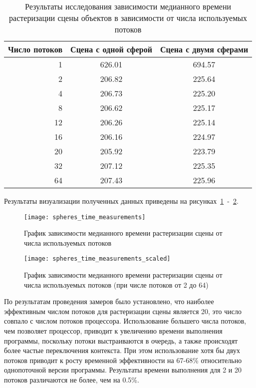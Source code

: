 \begin{table}[H]
	\begin{center}
		\begin{threeparttable}
			\centering
			\captionsetup{justification=raggedleft,singlelinecheck=off}
			\caption{\label{tb:meas}Результаты исследования зависимости медианного времени растеризации сцены объектов в зависимости от числа используемых потоков}
			\begin{tabular}{| r | c | c |} \hline
				Число потоков & Сцена с одной сферой & Сцена с двумя сферами \\ \hline
				1 & 626.01 & 694.57 \\ \hline
				2 & 206.82 & 225.64 \\ \hline
				4 & 206.73 & 225.20 \\ \hline
				8 & 206.62 & 225.17 \\ \hline
				12 & 206.26 & 225.14 \\ \hline
				16 & 206.16 & 224.97 \\ \hline
				20 & 205.92 & 223.79 \\ \hline
				32 & 207.12 & 225.35 \\ \hline
				64 & 207.43 & 225.96 \\ \hline
			\end{tabular}
		\end{threeparttable}
	\end{center}
\end{table}


Результаты визуализации полученных данных приведены на рисунках~\ref{fig:meas}~-~\ref{fig:meas_scaled}.
\begin{figure}[H]
	\centering
	\texttt{[image: spheres\_time\_measurements]}
	\caption{График зависимости медианного времени растеризации сцены от числа используемых потоков}
	\label{fig:meas}
\end{figure}

\begin{figure}[H]
	\centering
	\texttt{[image: spheres\_time\_measurements\_scaled]}
	\caption{График зависимости медианного времени растеризации сцены от числа используемых потоков (при числе потоков от 2 до 64)}
	\label{fig:meas_scaled}
\end{figure}

По результатам проведения замеров было установлено, что наиболее эффективным числом потоков для растеризации сцены является 20, это число совпало с числом потоков процессора. Использование большего числа потоков, чем позволяет процессор, приводит к увеличению времени выполнения программы, поскольку потоки выстраиваются в очередь, а также происходят более частые переключения контекста. При этом использование хотя бы двух потоков приводит к росту временной эффективности на 67-68\% относительно однопоточной версии программы. Результаты времени выполнения для 2 и 20 потоков различаются не более, чем на 0.5\%.

